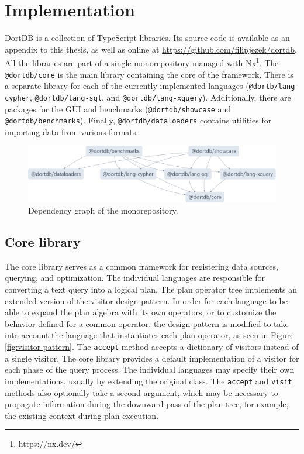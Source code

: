 \chapter{Implementation}
\label{chap:implementation}

DortDB is a collection of TypeScript libraries. Its source code is available as an appendix to this thesis, as well as online at \href{https://github.com/filipjezek/dortdb}{https://github.com/filipjezek/dortdb}. All the libraries are part of a single monorepository managed with Nx\footnote{\url{https://nx.dev/}}. The \texttt{@dortdb/core} is the main library containing the core of the framework. There is a separate library for each of the currently implemented languages (\texttt{@dortb/lang-cypher}, \texttt{@dortdb/lang-sql}, and \texttt{@dortdb/lang-xquery}). Additionally, there are packages for the GUI and benchmarks (\texttt{@dortdb/showcase} and \texttt{@dortdb/benchmarks}). Finally, \texttt{@dortdb/dataloaders} contains utilities for importing data from various formats.

\begin{figure}[htpb]
    \centering
    \includegraphics[width=\textwidth]{img/packages-graph.png}
    \caption{Dependency graph of the monorepository.}
\end{figure}

\section{Core library}

The core library serves as a common framework for registering data sources, querying, and optimization. The individual languages are responsible for converting a text query into a logical plan. The plan operator tree implements an extended version of the visitor design pattern\cite{johnson1995design}. In order for each language to be able to expand the plan algebra with its own operators, or to customize the behavior defined for a common operator, the design pattern is modified to take into account the language that instantiates each plan operator, as seen in Figure \ref{fig:visitor-pattern}. The \texttt{accept} method accepts a dictionary of visitors instead of a single visitor. The core library provides a default implementation of a visitor for each phase of the query process. The individual languages may specify their own implementations, usually by extending the original class. The \texttt{accept} and \texttt{visit} methods also optionally take a second argument, which may be necessary to propagate information during the downward pass of the plan tree, for example, the existing context during plan execution.

